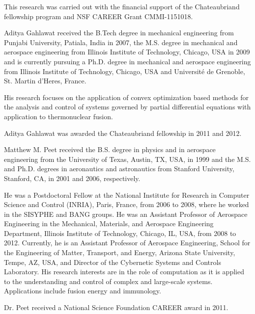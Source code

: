 \documentclass[9pt,journal,twocolumn]{IEEEtran}
\begin{document}
 This research was carried out with the financial support of the Chateaubriand fellowship program and NSF CAREER Grant CMMI-1151018.
 


\begin{IEEEbiographynophoto}{Aditya Gahlawat}
received the B.Tech degree in mechanical engineering from Punjabi University, Patiala, India in 2007, the M.S. degree in mechanical and aerospace engineering from Illinois Institute of Technology, Chicago, USA in 2009 and is currently pursuing a Ph.D. degree in mechanical and aerospace engineering from Illinois Institute of Technology, Chicago, USA and Universit\'{e} de Grenoble, St. Martin d'Heres, France. 

His research focuses on the application of convex optimization based methods for the analysis and control of systems governed by partial differential equations with application to thermonuclear fusion.

Aditya Gahlawat was awarded the Chateaubriand fellowship in 2011 and 2012.
\end{IEEEbiographynophoto}

\begin{IEEEbiographynophoto}{Matthew M. Peet}
received the B.S. degree in physics and in aerospace engineering from the University of Texas, Austin, TX, USA, in 1999 and the M.S. and Ph.D. degrees in aeronautics and astronautics from Stanford University, Stanford, CA, in 2001 and 2006,
respectively.

He was a Postdoctoral Fellow at the National Institute for Research in Computer Science and Control (INRIA), Paris, France, from 2006 to 2008, where he worked in the SISYPHE and BANG groups. He was an Assistant Professor of Aerospace Engineering in the Mechanical, Materials, and Aerospace Engineering Department, Illinois Institute of Technology, Chicago, IL, USA, from 2008 to 2012. Currently, he is an Assistant Professor of Aerospace Engineering, School for the Engineering of Matter, Transport, and Energy, Arizona State University, Tempe, AZ, USA, and Director of the Cybernetic Systems and Controls Laboratory. His research interests are in the role of computation as it is applied to the understanding and control of complex and large-scale systems. Applications include fusion energy and immunology.

Dr. Peet received a National Science Foundation CAREER award in 2011.
\end{IEEEbiographynophoto}
\end{document}
